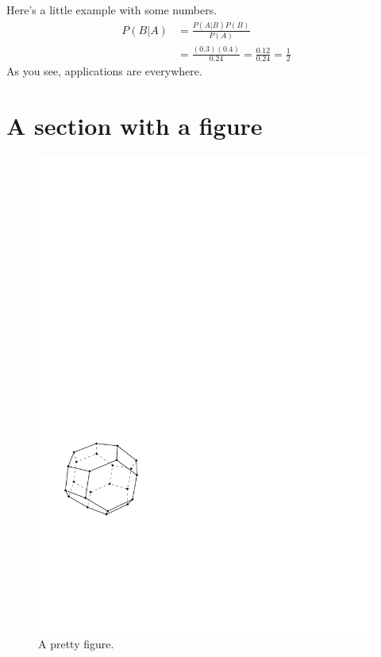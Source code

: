 \begin{example}
	Here's a little example with some numbers.
	\begin{align*}
		P(B | A) &= \frac{P(A | B) P(B)}{P(A)} \\
			 	 &= \frac{(0.3) (0.4)}{0.24} = \frac{0.12}{0.24} = \frac{1}{2}
	\end{align*}
	As you see, applications are everywhere.
\end{example}

\blindtext

\section{A section with a figure}
\blindtext
	\begin{figure}[ht!]
	\centering
	\includegraphics[width=0.3\linewidth]{figs/truncatedoctahedron}
	\caption{A pretty figure.}
	\label{fig:truncatedoctahedron}
	\end{figure}
\blindtext


